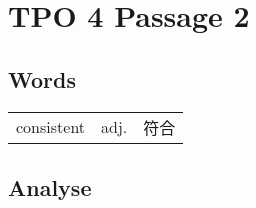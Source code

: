 \section{TPO 4 Passage 2}

\subsection{Words}

\begin{tabular}{lll}
    consistent & adj. & 符合 \\
\end{tabular}

\subsection{Analyse}

